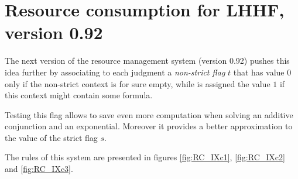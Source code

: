\newpage
\section{Resource consumption for LHHF, version 0.92}
\label{s:RC_IXc}

The next version of the resource management system (version 0.92) pushes this
idea further by associating to each judgment a {\em non-strict flag\/} $t$
that has value $0$ only if the non-strict context is for sure empty, while is
assigned the value $1$ if this context might contain some formula.

Testing this flag allows to save even more computation when solving an
additive conjunction and an exponential. Moreover it provides a better
approximation to the value of the strict flag $s$.

The rules of this system are presented in figures \ref{fig:RC_IXc1},
\ref{fig:RC_IXc2} and \ref{fig:RC_IXc3}.


